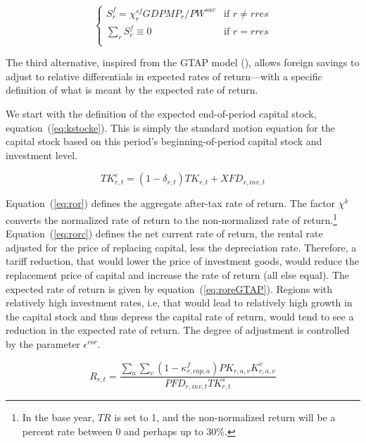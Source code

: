 \documentclass[11pt,letterpaper]{report}
\begin{document}
\begin{equation}
\label{eq:savfcapRFix}
\begin{cases}
   \displaystyle S^f_r = \chi^{\mathit{sf}}_r \mathit{GDPMP}_r
   / \mathit{PW}^{\mathit{sav}}
   & \textrm{if } r \ne \mathit{rres} \\
   \displaystyle \sum_r{S^f_r} \equiv 0
   & \textrm{if } r = \mathit{rres} \\
\end{cases}
\end{equation}

The third alternative, inspired from the GTAP model (\cite{Hertel1997}), allows
foreign savings to adjust to relative differentials in expected rates of
return---with a specific definition of what is meant by the expected rate of
return.

We start with the definition of the expected end-of-period capital stock,
equation~(\ref{eq:kstocke}). This is simply the standard motion equation for the
capital stock based on this period's beginning-of-period capital stock and
investment level.

\begin{equation}
\label{eq:kstocke}
\mathit{TK}^e_{r,t} =
   (1-\delta_{r,t})\mathit{TK}_{r,t}+\mathit{XFD}_{r,\mathit{inv},t}
\end{equation}

Equation~(\ref{eq:ror}) defines the aggregate after-tax rate of return. The
factor $\chi^k$ converts the normalized rate of return to the non-normalized
rate of return.\footnote{In the base year, $\mathit{TR}$ is set to 1, and the
non-normalized return will be a percent rate between 0 and perhaps up to 30\%.}
Equation~(\ref{eq:rorc}) defines the net current rate of return, the rental rate
adjusted for the price of replacing capital, less the depreciation rate.
Therefore, a tariff reduction, that would lower the price of investment goods,
would reduce the replacement price of capital and increase the rate of return
(all else equal). The expected rate of return is given by
equation~(\ref{eq:roreGTAP}). Regions with relatively high investment rates,
i.e, that would lead to relatively high growth in the capital stock and thus
depress the capital rate of return, would tend to see a reduction in the
expected rate of return. The degree of adjustment is controlled by the
parameter $\epsilon^{\mathit{ror}}$.

\begin{equation}
\label{eq:ror}
R_{r,t} =
   \frac{\sum_a{\sum_v{\left( 1 - \kappa^f_{r,\mathit{cap},a} \right)
      \mathit{PK}_{r,a,v} \mathit{K}^v_{r,a,v}
   }}}
   {\mathit{PFD}_{r,\mathit{inv},t} \mathit{TK}^s_{r,t}}
\end{equation}
\end{document}
